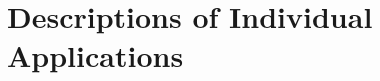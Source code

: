 \documentclass[twoside,11pt]{article}
\begin{document}
\newpage
\appendix
\section{Descriptions of Individual Applications}
\label{sun237_appendix_descriptions}











\newlength{\sstbannerlength}
\newlength{\sstcaptionlength}
\newlength{\sstexampleslength}
\newlength{\sstexampleswidth}

\end{document}

